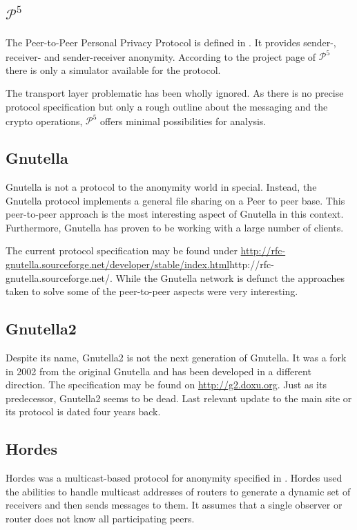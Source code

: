 \subsection{$\mathcal{P}^5$}
The Peer-to-Peer Personal Privacy Protocol is defined in \cite{sherwood-protocol}. It provides sender-, receiver- and sender-receiver anonymity. According to the project page of $\mathcal{P}^5$ there is only a simulator available for the protocol.

The transport layer problematic has been wholly ignored. As there is no precise protocol specification but only a rough outline about the messaging and the crypto operations, $\mathcal{P}^5$ offers minimal possibilities for analysis.

\subsection{Gnutella}
Gnutella is not a protocol to the anonymity world in special. Instead, the Gnutella protocol implements a general file sharing on a Peer to peer base. This peer-to-peer approach is the most interesting aspect of Gnutella in this context. Furthermore, Gnutella has proven to be working with a large number of clients.

The current protocol specification may be found under \url{http://rfc-gnutella.sourceforge.net/developer/stable/index.html}{http://rfc-gnutella.sourceforge.net/}. While the Gnutella network is defunct the approaches taken to solve some of the peer-to-peer aspects were very interesting.

\subsection{Gnutella2}
Despite its name, Gnutella2 is not the next generation of Gnutella. It was a fork in 2002 from the original Gnutella and has been developed in a different direction. The specification may be found on \url{http://g2.doxu.org}. Just as its predecessor, Gnutella2 seems to be dead. Last relevant update to the main site or its protocol is dated four years back.

\subsection{Hordes}
Hordes was a multicast-based protocol for anonymity specified in \cite{Levine:2002}. Hordes used the abilities to handle multicast addresses of routers to generate a dynamic set of receivers and then sends messages to them. It assumes that a single observer or router does not know all participating peers. 

